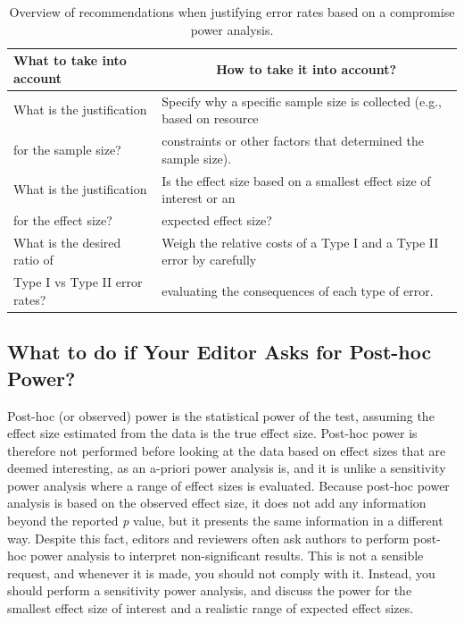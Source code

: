 \documentclass[
  english,
  ,jou, a4paper,floatsintext]{apa6}
\begin{document}
\begin{table}[tbp]

\begin{center}
\begin{threeparttable}

\caption{\label{tab:table-compromise-just}Overview of recommendations when justifying error rates based on a compromise power analysis.}

\begin{tabular}{ll}
\toprule
What to take into account & \multicolumn{1}{c}{How to take it into account?}\\
\midrule
What is the justification & Specify why a specific sample size is collected (e.g., based on resource\\
for the sample size? & constraints or other factors that determined the sample size).\\ \midrule
What is the justification & Is the effect size based on a smallest effect size of interest or an\\
for the effect size? & expected effect size?\\ \midrule
What is the desired ratio of & Weigh the relative costs of a Type I and a Type II error by carefully\\
Type I vs Type II error rates? & evaluating the consequences of each type of error.\\ \midrule
\bottomrule
\end{tabular}

\end{threeparttable}
\end{center}

\end{table}

\hypertarget{what-to-do-if-your-editor-asks-for-post-hoc-power}{%
\subsection{What to do if Your Editor Asks for Post-hoc Power?}\label{what-to-do-if-your-editor-asks-for-post-hoc-power}}

Post-hoc (or observed) power is the statistical power of the test, assuming the effect size estimated from the data is the true effect size. Post-hoc power is therefore not performed before looking at the data based on effect sizes that are deemed interesting, as an a-priori power analysis is, and it is unlike a sensitivity power analysis where a range of effect sizes is evaluated. Because post-hoc power analysis is based on the observed effect size, it does not add any information beyond the reported \emph{p} value, but it presents the same information in a different way. Despite this fact, editors and reviewers often ask authors to perform post-hoc power analysis to interpret non-significant results. This is not a sensible request, and whenever it is made, you should not comply with it. Instead, you should perform a sensitivity power analysis, and discuss the power for the smallest effect size of interest and a realistic range of expected effect sizes.
\end{document}
